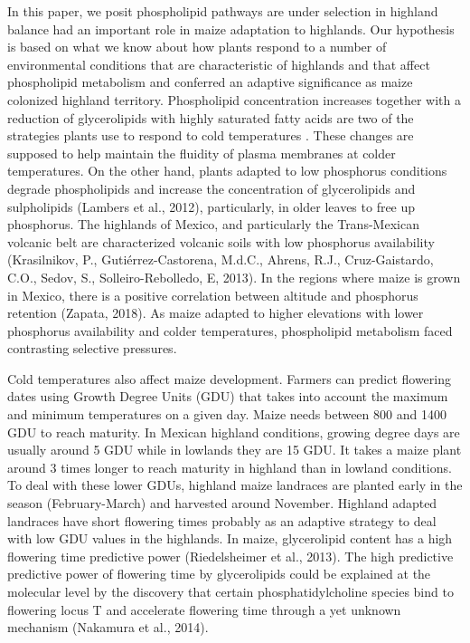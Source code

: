 \documentclass[9pt,twocolumn,twoside,lineno]{gsajnl}
\begin{document}
In this paper, we posit  phospholipid pathways are under selection in highland balance had an important role in maize adaptation to highlands.  
Our hypothesis is based on what we know about how plants respond to a number of environmental conditions that are characteristic of highlands and that affect phospholipid metabolism and conferred an adaptive significance as maize colonized highland territory. 
Phospholipid concentration increases \citep{Degenkolbe2012-wf} together with a reduction of glycerolipids with highly saturated fatty acids \citep{Welti2002-uk} are two of the strategies plants use to respond to cold temperatures \cite{Lynch1987-ln}. 
These changes are supposed to help maintain the fluidity of plasma membranes at colder temperatures. On the other hand, plants adapted to low phosphorus conditions degrade phospholipids and increase the concentration of glycerolipids and sulpholipids (Lambers et al., 2012), particularly, in older leaves to free up phosphorus. 
The highlands of Mexico, and particularly the Trans-Mexican volcanic belt are characterized volcanic soils with low phosphorus availability (Krasilnikov, P., Gutiérrez-Castorena, M.d.C., Ahrens, R.J., Cruz-Gaistardo, C.O., Sedov, S., Solleiro-Rebolledo, E, 2013). 
In the regions where maize is grown in Mexico, there is a positive correlation between altitude and phosphorus retention (Zapata, 2018). 
As maize adapted to higher elevations with lower phosphorus availability and colder temperatures, phospholipid metabolism faced contrasting selective pressures. 

Cold temperatures also affect maize development. Farmers can predict flowering dates using Growth Degree Units (GDU) that takes into account the maximum and minimum temperatures on a given day. 
Maize needs between 800 and 1400 GDU to reach maturity. 
In Mexican highland conditions, growing degree days are usually around 5 GDU while in lowlands they are 15 GDU. 
It takes a maize plant around 3 times longer to reach maturity in highland than in lowland conditions. To deal with these lower GDUs, highland maize landraces are planted early in the season (February-March) and harvested around November. 
Highland adapted landraces have short flowering times probably as an adaptive strategy to deal with low GDU values in the highlands.  
In maize, glycerolipid content has a high flowering time predictive power (Riedelsheimer et al., 2013). 
The high predictive predictive power of flowering time by glycerolipids could be explained at the molecular level by the discovery that certain phosphatidylcholine species bind to flowering locus T and accelerate flowering time through a yet unknown mechanism (Nakamura et al., 2014). 
 
\end{document}
